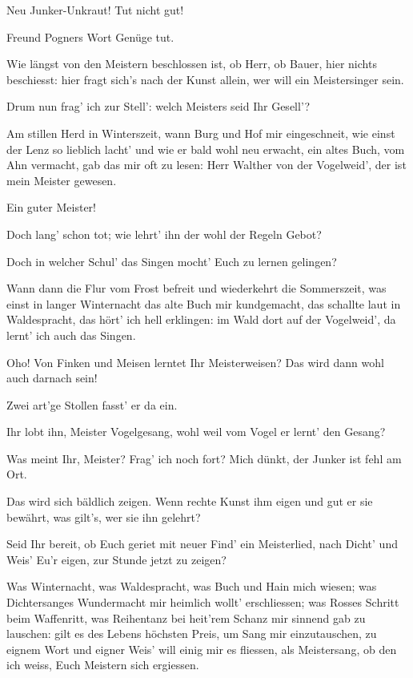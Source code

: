 \begin{drama}
\Beckmesserspeaks
Neu Junker-Unkraut! Tut nicht gut!

\Nachtigallspeaks
Freund Pogners Wort Genüge tut.

\Sachsspeaks
Wie längst von den Meistern beschlossen ist,
ob Herr, ob Bauer, hier nichts beschiesst:
hier fragt sich's nach der Kunst allein,
wer will ein Meistersinger sein.

\Kothnerspeaks
Drum nun frag' ich zur Stell':
welch Meisters seid Ihr Gesell'?

\Waltherspeaks

Am stillen Herd in Winterszeit,
wann Burg und Hof mir eingeschneit,
wie einst der Lenz so lieblich lacht'
und wie er bald wohl neu erwacht,
ein altes Buch, vom Ahn vermacht,
gab das mir oft zu lesen:
Herr Walther von der Vogelweid',
der ist mein Meister gewesen.

\Sachsspeaks
Ein guter Meister!

\Beckmesserspeaks
Doch lang' schon tot;
wie lehrt' ihn der wohl der Regeln Gebot?

\Kothnerspeaks
Doch in welcher Schul' das Singen
mocht' Euch zu lernen gelingen?

\Waltherspeaks
Wann dann die Flur vom Frost befreit
und wiederkehrt die Sommerszeit,
was einst in langer Winternacht
das alte Buch mir kundgemacht,
das schallte laut in Waldespracht,
das hört' ich hell erklingen:
im Wald dort auf der Vogelweid',
da lernt' ich auch das Singen.

\Beckmesserspeaks
Oho! Von Finken und Meisen
lerntet Ihr Meisterweisen?
Das wird dann wohl auch darnach sein!

\Vogelgesangspeaks
Zwei art'ge Stollen fasst' er da ein.

\Beckmesserspeaks
Ihr lobt ihn, Meister Vogelgesang,
wohl weil vom Vogel er lernt' den Gesang?

\Kothnerspeaks
Was meint Ihr, Meister? Frag' ich noch fort?
Mich dünkt, der Junker ist fehl am Ort.

\Sachsspeaks
Das wird sich bäldlich zeigen.
Wenn rechte Kunst ihm eigen
und gut er sie bewährt,
was gilt's, wer sie ihn gelehrt?

\Kothnerspeaks
{}

Seid Ihr bereit, ob Euch geriet
mit neuer Find' ein Meisterlied,
nach Dicht' und Weis' Eu'r eigen,
zur Stunde jetzt zu zeigen?

\Waltherspeaks
Was Winternacht, was Waldespracht,
was Buch und Hain mich wiesen;
was Dichtersanges Wundermacht
mir heimlich wollt' erschliessen;
was Rosses Schritt beim Waffenritt,
was Reihentanz bei heit'rem Schanz
mir sinnend gab zu lauschen:
gilt es des Lebens höchsten Preis,
um Sang mir einzutauschen,
zu eignem Wort und eigner Weis'
will einig mir es fliessen,
als Meistersang, ob den ich weiss,
Euch Meistern sich ergiessen.


\end{drama}
